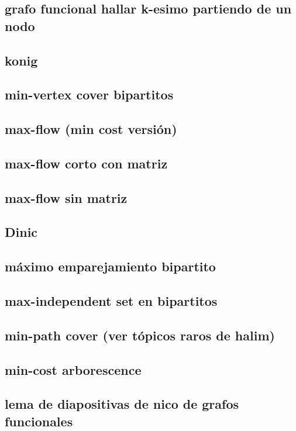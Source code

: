 \subsection{grafo funcional hallar k-esimo partiendo de un nodo}
\subsection{konig}
\subsection{min-vertex cover bipartitos}
\subsection{max-flow (min cost versión)}
\subsection{max-flow corto con matriz}
\subsection{max-flow sin matriz}
\subsection{Dinic}
\subsection{máximo emparejamiento bipartito}
\subsection{max-independent set en bipartitos}
\subsection{min-path cover (ver tópicos raros de halim)}
\subsection{min-cost arborescence}
\subsection{lema de diapositivas de nico de grafos funcionales }
